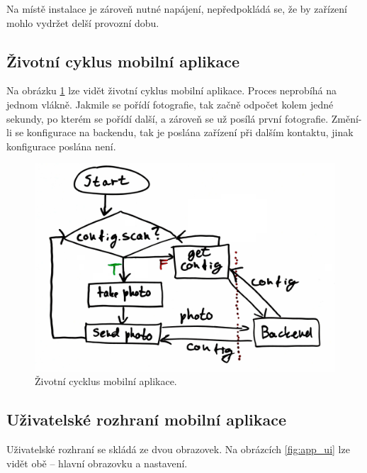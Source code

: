 Na místě instalace je zároveň nutné napájení, nepředpokládá se, že by zařízení mohlo vydržet delší provozní dobu.

\subsection{Životní cyklus mobilní aplikace}

\noindent
Na obrázku \ref{fig:app_lifecycle} lze vidět životní cyklus mobilní aplikace.
Proces neprobíhá na jednom vlákně. Jakmile se pořídí fotografie, tak začně odpočet kolem jedné
sekundy, po kterém se pořídí další, a zároveň se už posílá první fotografie.
Změní-li se konfigurace na backendu, tak je poslána zařízení při dalším kontaktu, jinak
konfigurace poslána není.

\begin{figure}[!htb] \centering
  \includegraphics[width=135mm]{../img/app_lifecycle.jpg}
  \caption{Životní cycklus mobilní aplikace.}
  \label{fig:app_lifecycle}
\end{figure}

\subsection{Uživatelské rozhraní mobilní aplikace}

\noindent
Uživatelské rozhraní se skládá ze dvou obrazovek. Na obrázcích \ref{fig:app_ui}
lze vidět obě -- hlavní obrazovku a nastavení.


